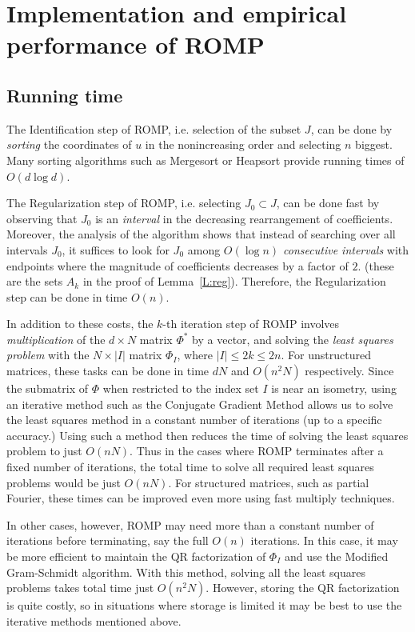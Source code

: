 \documentclass[12pt]{amsart}
\theoremstyle{plain}
\theoremstyle{definition}
\theoremstyle{remark}
\numberwithin{equation}{section}
\begin{document}
\section{Implementation and empirical performance of ROMP}
\label{s: implementation}

\subsection{Running time}

The Identification step of ROMP, i.e. selection of the subset $J$, 
can be done by {\em sorting} the coordinates of $u$ in the nonincreasing order 
and selecting $n$ biggest.
Many sorting algorithms such as Mergesort or Heapsort provide running times 
of $O(d\log d)$. 

The Regularization step of ROMP, i.e. selecting $J_0 \subset J$, 
can be done fast by observing that $J_0$ is an {\em interval} 
in the decreasing rearrangement of coefficients. 
Moreover, the analysis of the algorithm shows that instead of 
searching over all intervals $J_0$, it suffices
to look for $J_0$ among {\em $O(\log n)$ consecutive intervals}
with endpoints where the magnitude of coefficients decreases by a factor of $2$.
(these are the sets $A_k$ in the proof of Lemma~\ref{L:reg}).
Therefore, the Regularization step can be done in time $O(n)$.

In addition to these costs, the $k$-th iteration step of ROMP involves
{\em multiplication} of the $d \times N$ matrix $\Phi^*$ by a vector, 
and solving the {\em least squares problem} with the $N \times |I|$ matrix 
$\Phi_I$, where $|I| \le 2k \le 2n$. 
For unstructured matrices, these tasks can be done in time 
$dN$ and $O(n^2 N)$ respectively. 
Since the submatrix of $\Phi$ when restricted 
to the index set $I$ is near an isometry, using an iterative method 
such as the Conjugate Gradient Method allows us to solve the least 
squares method in a constant number of iterations (up to a specific 
accuracy.) Using such a method then reduces the time of solving the
least squares problem to just $O(nN)$. Thus in the cases where ROMP
terminates after a fixed number of iterations, the total time to solve
all required least squares problems would be just $O(nN)$. 
For structured matrices, such as
partial Fourier, these times can be improved even more using fast multiply
techniques. 

In other cases, however, ROMP may need more than a constant number
of iterations before terminating, say the full $O(n)$ iterations. In this case, 
it may be more efficient to maintain the QR factorization of $\Phi_I$ and use the Modified 
Gram-Schmidt algorithm. With this method, solving all the least squares problems
takes total time just $O(n^2 N).$ However, storing the QR factorization is quite costly, so
in situations where storage is limited it may be best to use the iterative methods mentioned above.
\end{document}
